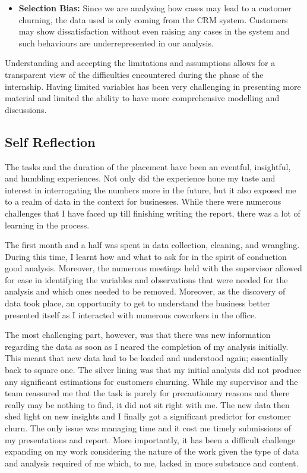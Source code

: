 \documentclass[
]{article}
\begin{document}
\begin{itemize}
\item
  \textbf{Selection Bias:} Since we are analyzing how cases may lead to a customer churning, the data used is only coming from the CRM system. Customers may show dissatisfaction without even raising any cases in the system and such behaviours are underrepresented in our analysis.
\end{itemize}

Understanding and accepting the limitations and assumptions allows for a transparent view of the difficulties encountered during the phase of the internship. Having limited variables has been very challenging in presenting more material and limited the ability to have more comprehensive modelling and discussions.

\subsection{Self Reflection}\label{self-reflection}

The tasks and the duration of the placement have been an eventful, insightful, and humbling experiences. Not only did the experience hone my taste and interest in interrogating the numbers more in the future, but it also exposed me to a realm of data in the context for businesses. While there were numerous challenges that I have faced up till finishing writing the report, there was a lot of learning in the process.

The first month and a half was spent in data collection, cleaning, and wrangling. During this time, I learnt how and what to ask for in the spirit of conduction good analysis. Moreover, the numerous meetings held with the supervisor allowed for ease in identifying the variables and observations that were needed for the analysis and which ones needed to be removed. Moreover, as the discovery of data took place, an opportunity to get to understand the business better presented itself as I interacted with numerous coworkers in the office.

The most challenging part, however, was that there was new information regarding the data as soon as I neared the completion of my analysis initially. This meant that new data had to be loaded and understood again; essentially back to square one. The silver lining was that my initial analysis did not produce any significant estimations for customers churning. While my supervisor and the team reassured me that the task is purely for precautionary reasons and there really may be nothing to find, it did not sit right with me. The new data then shed light on new insights and I finally got a significant predictor for customer churn. The only issue was managing time and it cost me timely submissions of my presentations and report. More importantly, it has been a difficult challenge expanding on my work considering the nature of the work given the type of data and analysis required of me which, to me, lacked in more substance and content.
\end{document}
